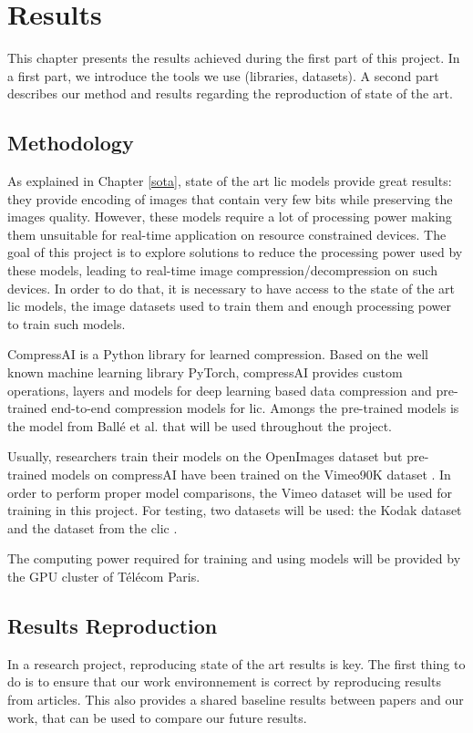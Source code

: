 \chapter{Results}
\label{results}
This chapter presents the results achieved during the first part of this project. In a first part, we introduce the tools we use (libraries, datasets). A second part describes our method and results regarding the reproduction of state of the art.

\section{Methodology}
As explained in Chapter \ref{sota}, state of the art \acrshort{lic} models provide great results: they provide encoding of images that contain very few bits while preserving the images quality. However, these models require a lot of processing power making them unsuitable for real-time application on resource constrained devices. The goal of this project is to explore solutions to reduce the processing power used by these models, leading to real-time image compression/decompression on such devices. In order to do that, it is necessary to have access to the state of the art \acrshort{lic} models, the image datasets used to train them and enough processing power to train such models.

CompressAI \cite{compressai} is a Python library for learned compression. Based on the well known machine learning library PyTorch, compressAI provides custom operations, layers and models for deep learning based data compression and pre-trained end-to-end compression models for \acrshort{lic}. Amongs the pre-trained models is the model from Ballé et al.\cite{ballemshj18} that will be used throughout the project.

Usually, researchers train their models on the OpenImages dataset \cite{openimages} but pre-trained models on compressAI have been trained on the Vimeo90K dataset \cite{xue2019video}. In order to perform proper model comparisons, the Vimeo dataset will be used for training in this project. For testing, two datasets will be used: the Kodak dataset \cite{kodak} and the dataset from the \acrfull{clic} \cite{clic}.

The computing power required for training and using models will be provided by the GPU cluster of Télécom Paris.

\section{Results Reproduction}
In a research project, reproducing state of the art results is key. The first thing to do is to ensure that our work environnement is correct by reproducing results from articles. This also provides a shared baseline results between papers and our work, that can be used to compare our future results.

